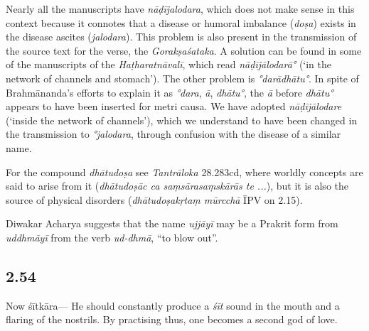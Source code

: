 \begin{ekdosis}
\begin{testimonia}[hp02_053]
\begin{versinnote}
\end{versinnote}
\end{testimonia}

\begin{philcomm}[hp02_053]
Nearly all the manuscripts have \emph{nāḍījalodara}, which does not make sense in this context because it connotes that a disease or humoral imbalance (\emph{doṣa}) exists in the disease ascites (\emph{jalodara}). This problem is also present in the transmission of the source text for the verse, the \emph{Gorakṣaśataka}. A solution can be found in some of the manuscripts of the \emph{Haṭharatnāvalī}, which read \emph{nāḍījālodarā°} (‘in the network of channels and stomach’). The other problem is \emph{°darādhātu°}. In spite of Brahmānanda’s efforts to explain it as \emph{°dara}, \emph{ā}, \emph{dhātu°}, the \emph{ā} before \emph{dhātu°} appears to have been inserted for metri causa. We have adopted \emph{nāḍījālodare} (‘inside the network of channels’), which we understand to have been changed in the transmission to \emph{°jalodara}, through confusion with the disease of a similar name.

For the compound \emph{dhātudoṣa} see \emph{Tantrāloka} 28.283cd, where worldly concepts are said to arise from it (\emph{dhātudoṣāc ca saṃsārasaṃskārās te ...}), but it is also the source of physical disorders (\emph{dhātudoṣakṛtaṃ mūrcchā} ĪPV on 2.15).

Diwakar Acharya suggests that the name \emph{ujjāyī} may be a Prakrit form from \emph{uddhmāyī} from the verb \emph{ud-dhmā}, “to blow out”.

\end{philcomm}

\subsection*{2.54}
\begin{translation}[hp02_054]
Now śītkāra---
He should constantly produce a \emph{śīt} sound in the mouth and a flaring of the nostrils. By practising thus, one becomes a second god of love.
\end{translation}


\end{ekdosis}
